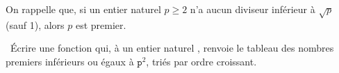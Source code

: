 On rappelle que, si un entier naturel $p \geq 2$ n'a aucun diviseur inférieur à $\sqrt{p}$ (sauf 1), alors $p$ est premier.


\question\ \'Ecrire une fonction  qui, à un entier naturel , renvoie le tableau des nombres premiers inférieurs ou égaux à $\texttt{p}^2$, triés par ordre croissant.